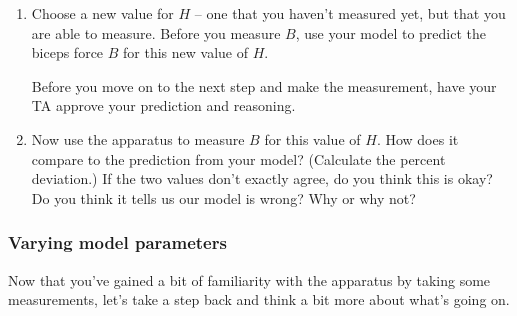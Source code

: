 \documentclass[11pt,letterpaper]{article}
\newcommand{\question}[2][blue]{\textcolor{#1}{#2}}
\newcommand{\answer}[2][red]{\textcolor{#1}{#2}}
\renewcommand{\question}[2][]{#2}
\renewcommand{\answer}[2][]{}
\begin{document}
\begin{enumerate}[series=labproc,label={\bf \arabic*.},
		ref=\textcolor{black}{\arabic*}]
\answer{The idea is that they need to realize to make a graph to do this.
	Then they just need to fit a trendline to the data, and realize
	the `formula' is just the equation of the line.
}

\item
Choose a new value for $H$ -- one that you haven't measured yet,
but that you are able to measure.  
Before you measure $B$, 
\question{use your model to predict the biceps force $B$ 
for this new value of $H$.}

Before you move on to the next step and make the measurement, 
have your TA approve your prediction and reasoning.

\item
Now use the apparatus to measure $B$ for this value of $H$.  
\question{How does it compare to the prediction from your model?  }
(Calculate the percent deviation.)
If the two values don't exactly agree, do
you think this is okay?  
\question{Do you think it tells us our model is wrong?}
Why or why not?

\end{enumerate}



\subsubsection*{Varying model parameters}

Now that you've gained a bit of familiarity with the apparatus
by taking some measurements, 
let's take a step back and think a bit more about what's going on.
\end{document}
